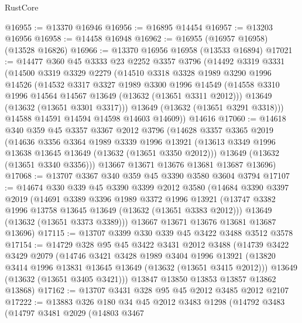 \begin{lexlean}{RustCore}
\begin{coremodule}
@16955 := @13370 @16946
@16956 := @16895 @14454
@16957 := @13203 @16956
@16958 := @14458 @16948
@16962 := @16955 (@16957 @16958) (@13528 @16826)
@16966 := @13370 @16956 @16958 (@13533 @16894)
@17021 := @14477
    @360
    @45
    @3333
    @23
    @2252
    @3357
    @3796
    (@14492
      @3319
      @3331
      (@14500
        @3319
        @3329
        @2279
        (@14510
          @3318
          @3328
          @1989
          @3290
          @1996
          @14526
          (@14532
            @3317
            @3327
            @1989
            @3300
            @1996
            @14549
            (@14558 @3310 @1996 @14564 @14567 @13649 (@13632 (@13651 @3311 @2012)))
            @13649
            (@13632 (@13651 @3301 @3317)))
          @13649
          (@13632 (@13651 @3291 @3318)))
        @14588
        @14591
        @14594
        @14598
        @14603
        @14609))
    @14616
@17060 := @14618
    @340
    @359
    @45
    @3357
    @3367
    @2012
    @3796
    (@14628
      @3357
      @3365
      @2019
      (@14636
        @3356
        @3364
        @1989
        @3339
        @1996
        @13921
        (@13613 @3349 @1996 @13638 @13645 @13649 (@13632 (@13651 @3350 @2012)))
        @13649
        (@13632 (@13651 @3340 @3356)))
      @13667
      @13671
      @13676
      @13681
      @13687
      @13696)
@17068 := @13707 @3367 @340 @359 @45 @3390 @3580 @3604 @3794
@17107 := @14674
    @330
    @339
    @45
    @3390
    @3399
    @2012
    @3580
    (@14684
      @3390
      @3397
      @2019
      (@14691
        @3389
        @3396
        @1989
        @3372
        @1996
        @13921
        (@13747 @3382 @1996 @13758 @13645 @13649 (@13632 (@13651 @3383 @2012)))
        @13649
        (@13632 (@13651 @3373 @3389)))
      @13667
      @13671
      @13676
      @13681
      @13687
      @13696)
@17115 := @13707 @3399 @330 @339 @45 @3422 @3488 @3512 @3578
@17154 := @14729
    @328
    @95
    @45
    @3422
    @3431
    @2012
    @3488
    (@14739
      @3422
      @3429
      @2079
      (@14746
        @3421
        @3428
        @1989
        @3404
        @1996
        @13921
        (@13820 @3414 @1996 @13831 @13645 @13649 (@13632 (@13651 @3415 @2012)))
        @13649
        (@13632 (@13651 @3405 @3421)))
      @13847
      @13850
      @13853
      @13857
      @13862
      @13868)
@17162 := @13707 @3431 @328 @95 @45 @2012 @3485 @2012 @2107
@17222 := @13883
    @326
    @180
    @34
    @45
    @2012
    @3483
    @1298
    (@14792
      @3483
      (@14797
        @3481
        @2029
        (@14803
          @3467

\end{coremodule}
\end{lexlean}
